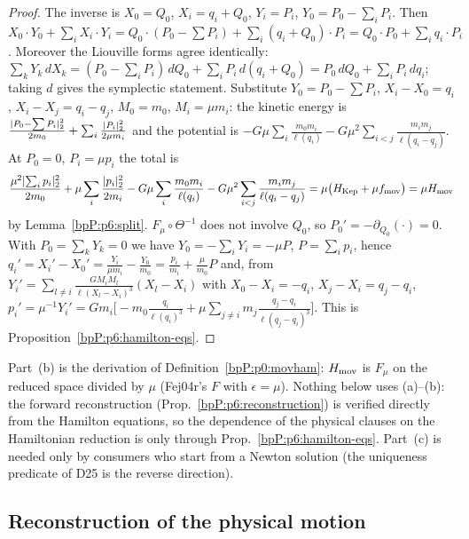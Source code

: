 \begin{proof}
\label{stepP:p6:re-a} The inverse is $X_0=Q_0$, $X_i=q_i+Q_0$, $Y_i=P_i$, $Y_0=P_0-\sum_iP_i$. Then $X_0\cdot Y_0+\sum_iX_i\cdot Y_i=Q_0\cdot(P_0-\sum P_i)+\sum_i(q_i+Q_0)\cdot P_i=Q_0\cdot P_0+\sum_iq_i\cdot P_i$. Moreover the Liouville forms agree identically: $\sum_kY_k\,dX_k=(P_0-\sum_iP_i)\,dQ_0+\sum_iP_i\,d(q_i+Q_0)=P_0\,dQ_0+\sum_iP_i\,dq_i$; taking $d$ gives the symplectic statement.\label{stepP:p6:re-b} Substitute $Y_0=P_0-\sum P_i$, $X_i-X_0=q_i$, $X_i-X_j=q_i-q_j$, $M_0=m_0$, $M_i=\mu m_i$: the kinetic energy is $\frac{\lvert P_0-\sum P_i\rvert_2^2}{2m_0}+\sum_i\frac{\lvert P_i\rvert_2^2}{2\mu m_i}$ and the potential is $-G\mu\sum_i\frac{m_0m_i}{\ell(q_i)}-G\mu^2\sum_{i<j}\frac{m_im_j}{\ell(q_i-q_j)}$. At $P_0=0$, $P_i=\mu p_i$ the total is
\[\frac{\mu^2\lvert \sum_ip_i\rvert_2^2}{2m_0}+\mu\sum_i\frac{\lvert p_i\rvert_2^2}{2m_i}-G\mu\sum_i\frac{m_0m_i}{\ell(q_i)}-G\mu^2\sum_{i<j}\frac{m_im_j}{\ell(q_i-q_j)}=\mu\bigl(H_{\rm Kep}+\mu f_{\rm mov}\bigr)=\mu H_{\rm mov}\]
by Lemma~\ref{bpP:p6:split}. $F_\mu\circ\Theta^{-1}$ does not involve $Q_0$, so $P_0'=-\partial_{Q_0}(\cdot)=0$.
\label{stepP:p6:re-c} With $P_0=\sum_kY_k=0$ we have $Y_0=-\sum_iY_i=-\mu P$, $P=\sum_ip_i$, hence
$q_i'=X_i'-X_0'=\frac{Y_i}{\mu m_i}-\frac{Y_0}{m_0}=\frac{p_i}{m_i}+\frac\mu{m_0}P$ and, from $Y_i'=\sum_{l\ne i}\frac{GM_iM_l}{\ell(X_l-X_i)^3}(X_l-X_i)$ with $X_0-X_i=-q_i$, $X_j-X_i=q_j-q_i$,
$p_i'=\mu^{-1}Y_i'=Gm_i\bigl[-m_0\frac{q_i}{\ell(q_i)^3}+\mu\sum_{j\ne i}m_j\frac{q_j-q_i}{\ell(q_j-q_i)^3}\bigr]$. This is Proposition~\ref{bpP:p6:hamilton-eqs}.
\end{proof}
\begin{remark}\label{bpP:p6:reduction-role}
Part~(b) is the derivation of Definition~\ref{bpP:p0:movham}: $H_{\rm mov}$ is $F_\mu$ on the reduced space divided by $\mu$ (Fej04r's $F$ with $\epsilon=\mu$). Nothing below uses (a)--(b): the forward reconstruction (Prop.~\ref{bpP:p6:reconstruction}) is verified directly from the Hamilton equations, so the dependence of the physical clauses on the Hamiltonian reduction is only through Prop.~\ref{bpP:p6:hamilton-eqs}. Part~(c) is needed only by consumers who start from a Newton solution (the uniqueness predicate  of D25 is the reverse direction).
\end{remark}

\subsection{Reconstruction of the physical motion}\label{bpP:p6:recon}

